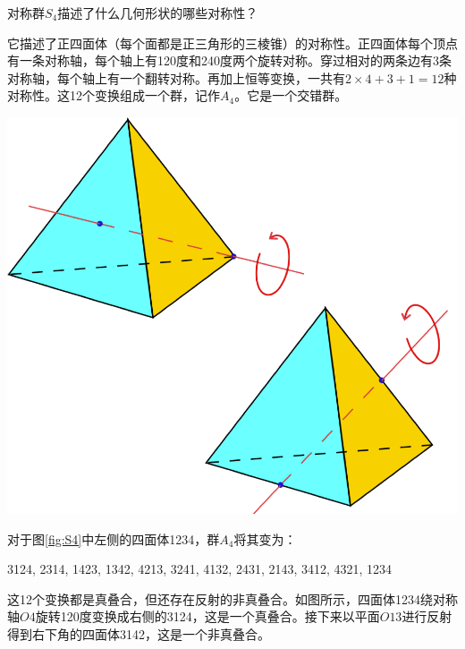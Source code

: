 \documentclass[b5paper]{ctexart}
\begin{document}
\begin{Answer}[ref={ex:symmetry-and-group}]
对称群$S_4$描述了什么几何形状的哪些对称性？

它描述了正四面体（每个面都是正三角形的三棱锥）的对称性。正四面体每个顶点有一条对称轴，每个轴上有120度和240度两个旋转对称。穿过相对的两条边有3条对称轴，每个轴上有一个翻转对称。再加上恒等变换，一共有$2 \times 4 + 3 + 1 = 12$种对称性。这12个变换组成一个群，记作$A_4$。它是一个交错群。

\begin{center}
 \includegraphics[scale=0.3]{../appendix/answer/img/tetrahedron}
 \label{fig:tetrahedron}
\end{center}

对于图\ref{fig:S4}中左侧的四面体1234，群$A_4$将其变为：

3124, 2314, 1423, 1342, 4213, 3241, 4132, 2431, 2143, 3412, 4321, 1234

这12个变换都是真叠合，但还存在反射的非真叠合。如图所示，四面体1234绕对称轴$O4$旋转120度变换成右侧的3124，这是一个真叠合。接下来以平面$O13$进行反射得到右下角的四面体3142，这是一个非真叠合。


\end{Answer}
\end{document}
